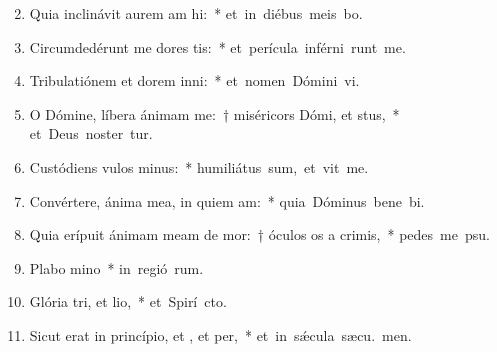 \begin{flushleft}
\begin{enumerate}[leftmargin=*]
\setcounter{enumi}{1}


\item Quia inclinávit aurem am hi:~* \mbox{et in diébus meis bo.}
\item Circumdedérunt me dores tis:~* \mbox{et perícula inférni runt me.}
\item Tribulatiónem et dorem inni:~* \mbox{et nomen Dómini vi.}
\item O Dómine, líbera ánimam me:~† miséricors Dómi, et stus,~* \mbox{et Deus noster tur.}
\item Custódiens vulos minus:~* \mbox{humiliátus sum, et vit me.}
\item Convértere, ánima mea, in quiem am:~* \mbox{quia Dóminus bene bi.}
\item Quia erípuit ánimam meam de mor:~† óculos os a crimis,~* \mbox{pedes me  psu.}
\item Plabo mino~* \mbox{in regió rum.}
\item Glória tri, et lio,~* \mbox{et Spirí cto.}
\item Sicut erat in princípio, et , et per,~* \mbox{et in s\'{\ae}cula sæcu. men.}

\end{enumerate}
\end{flushleft}

